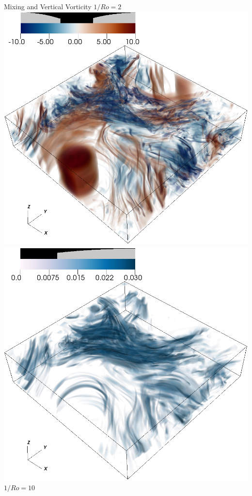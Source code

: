 \documentclass[aspecttatio=169]{beamer}
\begin{document}
\begin{frame}{Mixing and Vertical Vorticity}
    \emp
        \centering
        $1/Ro = 2$
        \includegraphics[width=.95\textwidth]{images/vortz_Om2_vr2.png}
        \includegraphics[width=.95\textwidth]{images/chi_Om2_vr2.png}
    \emp
        \centering
        $1/Ro = 10$

\end{frame}
\end{document}
